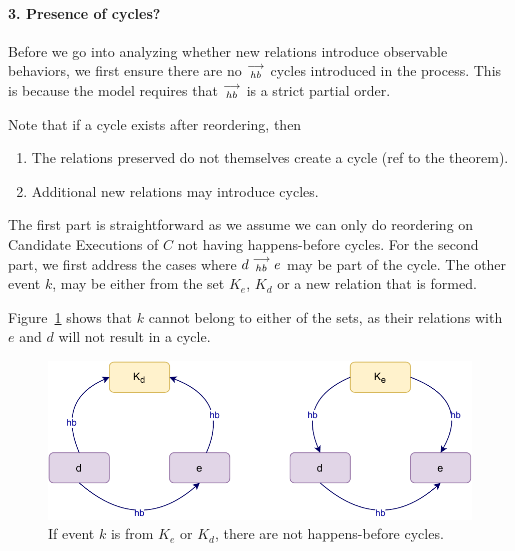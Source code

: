 
\paragraph{3. Presence of cycles?}
    Before we go into analyzing whether new relations introduce observable behaviors, we first ensure there are no $\stackrel{\longrightarrow}{_\textit{hb}}$ cycles introduced in the process. 
    This is because the model requires that $\stackrel{\longrightarrow}{_{hb}}$ is a strict partial order. 
    
    Note that if a cycle exists after reordering, then 
    \begin{enumerate}
        \item The relations preserved do not themselves create a cycle (ref to the theorem).
        \item Additional new relations may introduce cycles.
    \end{enumerate}

    The first part is straightforward as we assume we can only do reordering on Candidate Executions of $C$ not having happens-before cycles. 
    For the second part, we first address the cases where $d\stackrel{\longrightarrow}{_{hb}}e$ may be part of the cycle. 
    The other event $k$, may be either from the set $K_e$, $K_d$ or a new relation that is formed\footnotemark.

    
    Figure~\ref{reord:cycle(a)} shows that $k$ cannot belong to either of the sets, as their relations with $e$ and $d$ will not result in a cycle. 
    \begin{figure}[H]
        \centering
        \includegraphics[scale=0.7]{4.InstructionReordering/4.ValidReorderingCandidate/ProofParts/Part3/part3(b).pdf}
        \caption{If event $k$ is from $K_e$ or $K_d$, there are not happens-before cycles.}
        \label{reord:cycle(a)}
    \end{figure}

